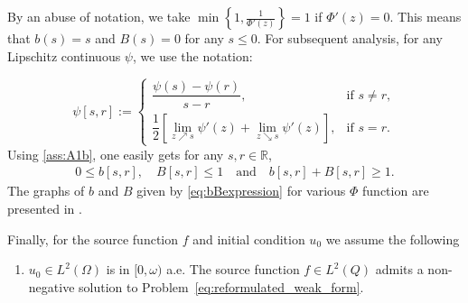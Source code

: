 \documentclass[review,11pt]{article}
\numberwithin{equation}{section}
\def \Om {\Omega}
\def \R  {{\mathbb{R}}}
\newtheorem{definition}[definition]{Definition}
\begin{document}
\noindent
By an abuse of notation, we take $\min\left\{1, \frac{1}{\Phi'(z)}\right\} = 1$ if $\Phi'(z)=0$. 
This means that $b(s)=s$ and $B(s)=0$ for any $s \le 0$. %
For subsequent analysis, for any Lipschitz continuous $\psi$, we use the notation:


\begin{equation}\label{eq:def_errors_b}
    \psi[s,r]
    :=
    \begin{cases}
        \dfrac{\psi(s)-\psi(r)}{s-r}, &\text{if } s\neq r, \\[1em]
        \dfrac{1}{2}\left[\lim\limits_{z\nearrow s} \psi'(z) + \lim\limits_{z\searrow s} \psi'(z)\right], &\text{if }  s=r.
    \end{cases}
\end{equation}
Using \ref{ass:A1b}, one easily gets for any $s, r \in \mathbb{R}$,
\begin{align}\label{eq:condition}
0 \leq b[s,r], \quad B[s,r]\leq 1 \quad {\text{and}} \quad 
 b[s,r]+B[s,r] \geq 1.
\end{align} 
The graphs of $b$ and $B$ given by \eqref{eq:bBexpression} for various $\Phi$ function are presented in . 

\noindent
Finally, for the source function $f$ and initial condition $u_0$ we assume the following
\begin{enumerate}[label=(B.\arabic*)]
\item \label{ass:A2} $u_0\in L^2(\Om)$ is in $[0,\omega)$ a.e. The source function $f\in L^2(Q)$ admits a non-negative solution to Problem~\ref{eq:reformulated_weak_form}.
\end{enumerate}
\end{document}
